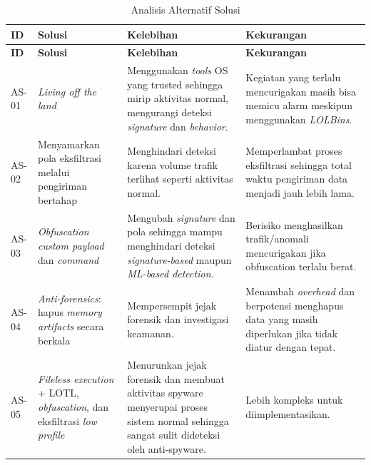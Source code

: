 \renewcommand{\arraystretch}{1.4}

\begin{longtable}{|p{1.5cm}|p{3.3cm}|p{4cm}|p{4cm}|}
\caption{Analisis Alternatif Solusi}
\label{tbl:analisis-solusi} \\
\hline
\textbf{ID} & \textbf{Solusi} & \textbf{Kelebihan} & \textbf{Kekurangan} \\
\hline
\endfirsthead

\hline
\textbf{ID} & \textbf{Solusi} & \textbf{Kelebihan} & \textbf{Kekurangan} \\
\hline
\endhead

\hline
\endfoot

AS-01 & \textit{Living off the land} &
Menggunakan \textit{tools} OS yang trusted sehingga mirip aktivitas normal, mengurangi deteksi \textit{signature} dan \textit{behavior}. &
Kegiatan yang terlalu mencurigakan masih bisa memicu alarm meskipun menggunakan \textit{LOLBins}. \\
\hline

AS-02 & Menyamarkan pola eksfiltrasi melalui pengiriman bertahap &
Menghindari deteksi karena volume trafik terlihat seperti aktivitas normal. &
Memperlambat proses eksfiltrasi sehingga total waktu pengiriman data menjadi jauh lebih lama. \\
\hline

AS-03 & \textit{Obfuscation custom payload} dan \textit{command} &
Mengubah \textit{signature} dan pola sehingga mampu menghindari deteksi \textit{signature-based} maupun \textit{ML-based detection}. &
Berisiko menghasilkan trafik/anomali mencurigakan jika obfuscation terlalu berat. \\
\hline

AS-04 & \textit{Anti-forensics}: hapus \textit{memory artifacts} secara berkala &
Mempersempit jejak forensik dan investigasi keamanan. &
Menambah \textit{overhead} dan berpotensi menghapus data yang masih diperlukan jika tidak diatur dengan tepat. \\
\hline

AS-05 & \textit{Fileless execution} + LOTL, \textit{obfuscation}, dan eksfiltrasi \textit{low profile} &
Menurunkan jejak forensik dan membuat aktivitas spyware menyerupai proses sistem normal sehingga sangat sulit dideteksi oleh anti-spyware. &
Lebih kompleks untuk diimplementasikan. \\
\hline

\end{longtable}

